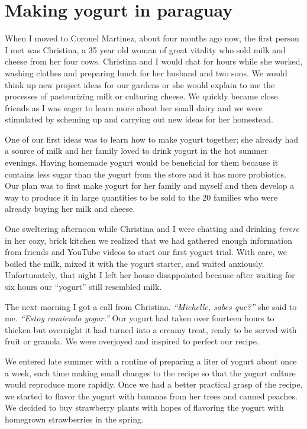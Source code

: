 \documentclass[10pt,a6paper,footinclude=false,firstfoot=false,headinclude=true,open=any,DIV=6]{scrbook} %
\begin{document}
\chapter{Making yogurt in paraguay}

When I moved to Coronel Martinez, about four months ago now, the first person I met was Christina, a 35 year old woman of great vitality who sold milk and cheese from her four cows. Christina and I  would chat for hours while she worked, washing clothes and preparing lunch for her husband and two sons. We would think up new project ideas for our gardens or she would explain to me the processes of pasteurizing milk or culturing cheese. We quickly became close friends as I was eager to learn more about her small dairy and we were stimulated by scheming up and carrying out new ideas for her homestead.
 
One of our first ideas was to learn how to make yogurt together; she already had a source of milk and her family loved to drink yogurt in the hot summer evenings. Having homemade yogurt would be beneficial for them because it contains less sugar than the yogurt from the store and it has more probiotics. Our plan was to first make yogurt for her family and myself and then develop a way to produce it in large quantities to be sold  to the 20 families who were already buying her milk and cheese.
 
One sweltering afternoon while Christina and I were chatting and drinking \textit{terere} in her cozy, brick kitchen we realized that we had gathered enough information from friends and YouTube videos to start our first yogurt trial. With care, we boiled the milk, mixed it with the yogurt starter, and waited anxiously. Unfortunately, that night I left her house disappointed because after waiting for six hours our ``yogurt'' still resembled milk.
 
The next morning I got a call from Chris\-tina. \textit{``Mich\-elle, sa\-bes que?''} she said to me. \textit{``Estoy com\-iendo yo\-gur.''} Our yogurt had taken over fourteen hours to thicken but overnight it had turned into a creamy treat, ready to be served with fruit or granola. We were overjoyed and inspired to perfect our recipe.
 
We entered late summer with a routine of preparing a liter of yogurt about once a week, each time making small changes to the recipe so that the yogurt culture would reproduce more rapidly. Once we had a better practical grasp of the recipe, we started to flavor the yogurt with bananas from her trees and canned peaches. We decided to buy strawberry plants with hopes of flavoring the yogurt with homegrown strawberries in the spring.
 
\end{document}
